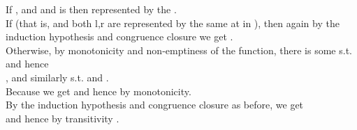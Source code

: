 \begin{theorem}
If , and  and is then represented by the \GFA{} .\\
If  (that is,  and both l,r are represented by the same \GFA{} at  in ), then again by the induction hypothesis and congruence closure we get .\\
Otherwise, by monotonicity and non-emptiness of the \terms{} function, there is some  s.t.  and hence \\
, and similarly  s.t.  and . \\
Because  we get  and hence  by monotonicity. \\
By the induction hypothesis and congruence closure as before, we get \\
 and hence by transitivity .\\
\QED
\end{theorem}

